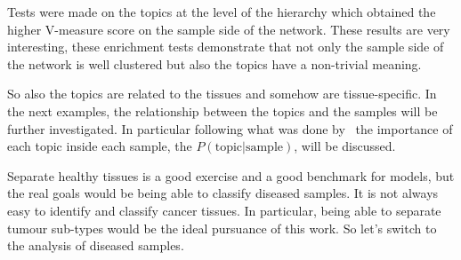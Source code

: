 Tests were made on the topics at the level of the hierarchy which obtained the higher V-measure score on the sample side of the network. These results are very interesting, these enrichment tests demonstrate that not only the sample side of the network is well clustered but also the topics have a non-trivial meaning.

So also the topics are related to the tissues and somehow are tissue-specific. In the next examples, the relationship between the topics and the samples will be further investigated. In particular following what was done by~\cite{dey2017visualizing} the importance of each topic inside each sample, the $P(\text{topic} | \text{sample})$, will be discussed.

\FloatBarrier
Separate healthy tissues is a good exercise and a good benchmark for models, but the real goals would be being able to classify diseased samples. It is not always easy to identify and classify cancer tissues. In particular, being able to separate tumour sub-types would be the ideal pursuance of this work. So let's switch to the analysis of diseased samples.
